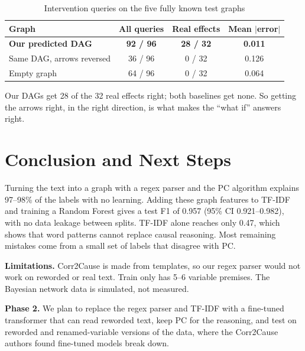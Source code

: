 \documentclass[conference]{IEEEtran}
\begin{document}
\begin{table}[t]
\centering
\caption{Intervention queries on the five fully known test graphs}
\label{tab:queries}
\footnotesize
\setlength{\tabcolsep}{4pt}
\begin{tabular}{lccc}
\toprule
Graph & All queries & Real effects & Mean $|$error$|$ \\
\midrule
\textbf{Our predicted DAG} & \textbf{92 / 96} & \textbf{28 / 32} & \textbf{0.011} \\
Same DAG, arrows reversed & 36 / 96 & 0 / 32 & 0.126 \\
Empty graph & 64 / 96 & 0 / 32 & 0.064 \\
\bottomrule
\end{tabular}
\end{table}

Our DAGs get 28 of the 32 real effects right; both baselines get none. So getting the arrows right, in the right
direction, is what makes the ``what if'' answers right.

\section{Conclusion and Next Steps}
Turning the text into a graph with a regex parser and the PC algorithm explains 97--98\% of the labels with no
learning. Adding these graph features to TF-IDF and training a Random Forest gives a test F1 of 0.957 (95\% CI
0.921--0.982), with no data leakage between splits. TF-IDF alone reaches only 0.47, which shows that word patterns
cannot replace causal reasoning. Most remaining mistakes come from a small set of labels that disagree with PC.

\textbf{Limitations.} Corr2Cause is made from templates, so our regex parser would not work on reworded or real
text. Train only has 5--6 variable premises. The Bayesian network data is simulated, not measured.

\textbf{Phase 2.} We plan to replace the regex parser and TF-IDF with a fine-tuned transformer that can read
reworded text, keep PC for the reasoning, and test on reworded and renamed-variable versions of the data, where the
Corr2Cause authors found fine-tuned models break down.
\end{document}
